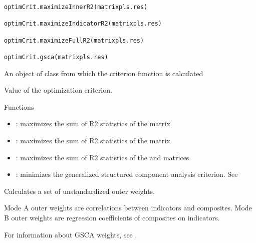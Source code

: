 \documentclass[a4paper]{book}
\begin{document}
%
\begin{Usage}
\begin{verbatim}
optimCrit.maximizeInnerR2(matrixpls.res)

optimCrit.maximizeIndicatorR2(matrixpls.res)

optimCrit.maximizeFullR2(matrixpls.res)

optimCrit.gsca(matrixpls.res)
\end{verbatim}
\end{Usage}
%
\begin{Arguments}
\begin{ldescription}
\item[\code{matrixpls.res}] An object of class  from which the
criterion function is calculated
\end{ldescription}
\end{Arguments}
%
\begin{Value}
Value of the optimization criterion.
\end{Value}
%
\begin{Section}{Functions}
\begin{itemize}

\item{} : maximizes the sum of R2 statistics of the  matrix

\item{} : maximizes the sum of R2 statistics of the  matrix.

\item{} : maximizes the sum of R2 statistics of the  and  matrices.

\item{} : minimizes the generalized structured component analysis criterion. See 

\end{itemize}
\end{Section}
%
\begin{SeeAlso}\relax
{}
\end{SeeAlso}
%
\begin{Description}\relax
Calculates a set of unstandardized outer weights.

Mode A outer weights are correlations between indicators and composites.
Mode B outer weights are regression coefficients of composites on indicators. 

For information about GSCA weights, see .
\end{Description}
\end{document}
